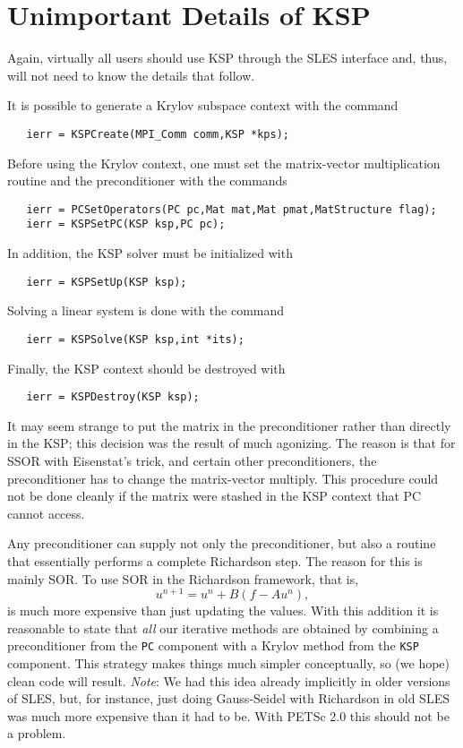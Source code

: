 {\section{Unimportant Details of KSP}

Again, virtually all users should use KSP through the SLES interface
and, thus, will not need to know the details that follow. 

It is possible to generate a Krylov subspace context with the 
command 
\begin{verbatim}
   ierr = KSPCreate(MPI_Comm comm,KSP *kps);
\end{verbatim}
Before using the Krylov context, one must set the matrix-vector multiplication routine and
the preconditioner with the 
commands  
\begin{verbatim}
   ierr = PCSetOperators(PC pc,Mat mat,Mat pmat,MatStructure flag);
   ierr = KSPSetPC(KSP ksp,PC pc);
\end{verbatim}
In addition, the KSP solver must be initialized with 
\begin{verbatim}
   ierr = KSPSetUp(KSP ksp);
\end{verbatim}
Solving a linear system is done with the command 
\begin{verbatim}
   ierr = KSPSolve(KSP ksp,int *its);
\end{verbatim}
Finally, the KSP context should be destroyed with 
\begin{verbatim}
   ierr = KSPDestroy(KSP ksp);
\end{verbatim}

It may seem strange to put the matrix in the preconditioner rather
than directly in the KSP; this decision was the result of much
agonizing. The reason is that for SSOR with Eisenstat's trick, and 
certain other preconditioners, the
preconditioner has to change the matrix-vector multiply.  This 
procedure could not
be done cleanly if the matrix were stashed in the KSP context that
PC cannot access.

Any preconditioner can supply not 
only the preconditioner, but also a routine that essentially performs a
complete Richardson step. The reason for this is mainly SOR. To 
use SOR in the Richardson framework, that is,
\[
  u^{n+1} = u^{n} + B(f - A u^{n}), 
\]
is much more expensive than just updating the values.
With this addition it is reasonable to state that {\em all} our
iterative methods are obtained by combining a preconditioner from 
the {\tt PC} component with a Krylov method from the {\tt KSP}
component. This strategy makes things much simpler conceptually, so 
(we hope)
clean code will result. {\em Note}: We had this idea already implicitly in 
older versions of SLES, but, for instance, just doing Gauss-Seidel
with Richardson in old SLES was much more expensive than it had to be. 
With PETSc 2.0 this should not be a problem. 

}
